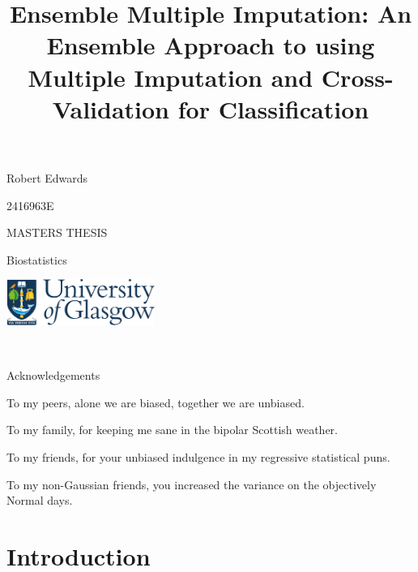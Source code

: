 \documentclass[12pt,]{article}
\title{Ensemble Multiple Imputation: An Ensemble Approach to using Multiple
Imputation and Cross-Validation for Classification}
\author{}
\date{}
\begin{document}
\maketitle

\vspace{4cm}

\begin{center}
Robert Edwards 

\vspace{0.125cm}
2416963E


\vspace{1cm}
MASTERS THESIS 

\vspace{0.125cm}
Biostatistics

\vspace{9cm}
  \includegraphics[height = 1.5cm]{images/GUlogo.png}
\end{center}

\newpage

\begin{center}
~
 
\vspace{5cm}
Acknowledgements 

\vspace{3cm}
To my peers, alone we are biased, together we are unbiased.

\vspace{1cm}
To my family, for keeping me sane in the bipolar Scottish weather. 

\vspace{1cm}
To my friends, for your unbiased indulgence in my regressive statistical puns. 

\vspace{1cm}
To my non-Gaussian friends, you increased the variance on the objectively Normal days. 

\end{center}

\newpage 

\setcounter{tocdepth}{2} \tableofcontents  

\newpage

\section{Introduction}\label{introduction}
\end{document}
